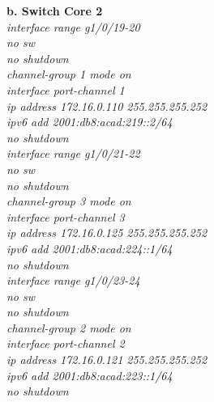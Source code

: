 \documentclass[12pt,a4paper]{report}
\begin{document}
\hspace*{1cm}\textbf{b. Switch Core 2}\\
\hspace*{2cm}\textit{interface range g1/0/19-20\\
\hspace*{2cm}no sw\\
\hspace*{2cm}no shutdown\\
\hspace*{2cm}channel-group 1 mode on \\
\hspace*{2cm}interface port-channel 1\\
\hspace*{2cm}ip address 172.16.0.110 255.255.255.252\\
\hspace*{2cm}ipv6 add 2001:db8:acad:219::2/64\\
\hspace*{2cm}no shutdown\\
\hspace*{2cm}interface range g1/0/21-22\\
\hspace*{2cm}no sw\\
\hspace*{2cm}no shutdown\\
\hspace*{2cm}channel-group 3 mode on \\
\hspace*{2cm}interface port-channel 3\\
\hspace*{2cm}ip address 172.16.0.125 255.255.255.252\\
\hspace*{2cm}ipv6 add 2001:db8:acad:224::1/64\\
\hspace*{2cm}no shutdown\\
\hspace*{2cm}interface range g1/0/23-24\\
\hspace*{2cm}no sw\\
\hspace*{2cm}no shutdown\\
\hspace*{2cm}channel-group 2 mode on \\
\hspace*{2cm}interface port-channel 2\\
\hspace*{2cm}ip address 172.16.0.121 255.255.255.252\\
\hspace*{2cm}ipv6 add 2001:db8:acad:223::1/64\\
\hspace*{2cm}no shutdown\\}
\end{document}
